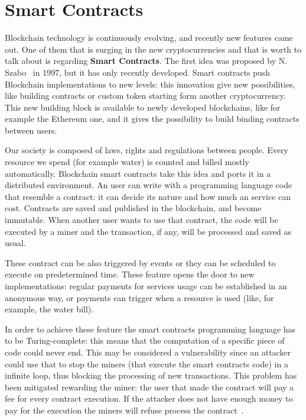 \section{Smart Contracts}
\label{sec:smart_contracts}

Blockchain technology is continuously evolving, and recently new features came
out. One of them that is surging in the new cryptocurrencies and that is worth
to talk about is regarding \textbf{Smart Contracts}.
The first idea was proposed by N. Szabo~\cite{szabo97} in 1997, but it has
only recently developed. Smart contracts push Blockchain implementations to
new levels: this innovation give new possibilities, like building contracts or
custom token starting form another cryptocurrency.
This new building block is available to newly developed blockchains, like for
example the Ethereum one, and it gives the possibility to build binding
contracts between users.

Our society is composed of laws, rights and regulations between people. Every
resource we spend (for example water) is counted and billed mostly
automatically.
Blockchain smart contracts take this idea and ports it in a distributed
environment.
An user can write with a programming language code that resemble a contract: it
can decide its nature and how much an service can cost. Contracts are saved and
published in the blockchain, and become immutable.
When another user wants to use that contract, the code will be executed by a
miner and the transaction, if any, will be processed and saved as usual.

These contract can be also triggered by events or they can be scheduled to
execute on predetermined time. These feature opens the door to new
implementations: regular payments for services usage can be established in an
anonymous way, or payments can trigger when a resource is used (like, for
example, the water bill).

In order to achieve these feature the smart contracts programming language has
to be Turing-complete: this means that the computation of a specific piece of
code could never end. This may be considered a vulnerability since an attacker
could use that to stop the miners (that execute the smart contracts code) in a
infinite loop, thus blocking the processing of new transactions.  This problem
has been mitigated rewarding the miner: the user that made the contract will
pay a fee for every contract execution. If the attacker does not have enough
money to pay for the execution the miners will refuse process
the contract~\cite{kosba16}.
